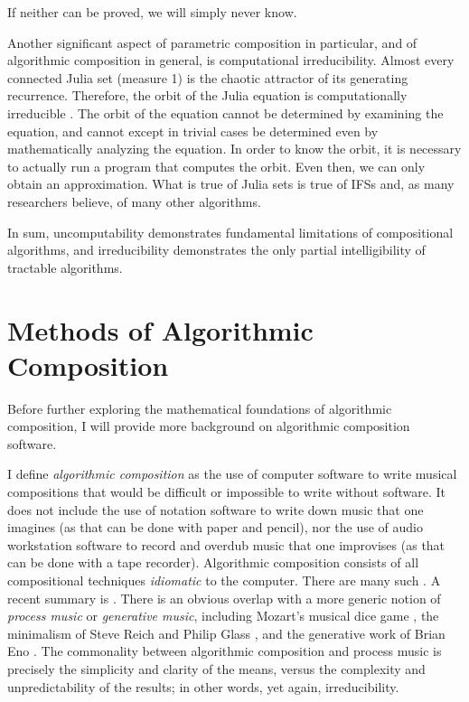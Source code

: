 \documentclass[]{interact}
\theoremstyle{plain}%
\theoremstyle{definition}
\theoremstyle{remark}
\begin{document}
If neither can be proved, we will simply never know.

Another significant aspect of parametric composition in particular, and of algorithmic composition in general, is computational irreducibility. Almost every connected Julia set (measure 1) is the chaotic attractor of its generating recurrence. Therefore, the orbit of the Julia equation is computationally irreducible \citep{zwirn2015computational}. The orbit of the equation cannot be determined by examining the equation, and cannot except in trivial cases be determined even by mathematically analyzing the equation. In order to know the orbit, it is necessary to actually run a program that computes the orbit. Even then, we can only obtain an approximation. What is true of Julia sets is true of IFSs and, as many researchers believe, of many other algorithms.

In sum, uncomputability demonstrates fundamental limitations of compositional algorithms, and irreducibility demonstrates the only partial intelligibility of tractable algorithms.

\section{Methods of Algorithmic Composition}

Before further exploring the mathematical foundations of algorithmic composition, I will provide more background on algorithmic composition software.

I define \emph{algorithmic composition} as the use of computer software to write musical compositions that would be difficult or impossible to write without software. It does not include the use of notation software to write down music that one imagines (as that can be done with paper and pencil), nor the use of audio workstation software to record and overdub music that one improvises (as that can be done with a tape recorder). Algorithmic composition consists of all compositional techniques \emph{idiomatic} to the computer. There are many such \citep{fernandez2013ai, arizanet}. A recent summary is \citep{mclean2018oxford}. There is an obvious overlap with a more generic notion of \emph{process music} or \emph{generative music}, including Mozart's musical dice game \citep{humdrumdice}, the minimalism of Steve Reich \citep{reichprocess, 10.2307/832600} and Philip Glass \citep{potter2002four, glass2015words}, and the generative work of Brian Eno \citep{eno1996generative}. The commonality between algorithmic composition and process music is precisely the simplicity and clarity of the means, versus the complexity and unpredictability of the results; in other words, yet again, irreducibility. 
\end{document}
